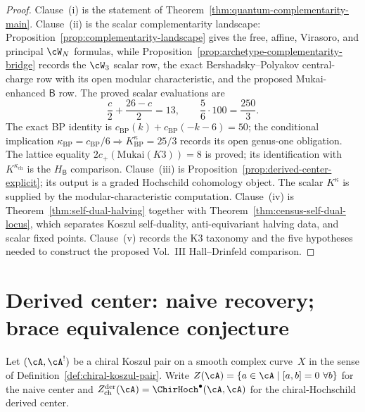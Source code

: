 \begin{proof}
Clause~\textup{(i)} is the statement of
Theorem~\ref{thm:quantum-complementarity-main}. Clause~\textup{(ii)}
is the scalar complementarity landscape:
Proposition~\ref{prop:complementarity-landscape} gives the free,
affine, Virasoro, and principal $\cW_N$ formulas, while
Proposition~\ref{prop:archetype-complementarity-bridge} records the
$\cW_3$ scalar row, the exact Bershadsky--Polyakov central-charge row
with its open modular characteristic, and the proposed
Mukai-enhanced $\mathsf B$ row.  The proved scalar evaluations are
\[
\frac{c}{2}+\frac{26-c}{2}=13,\qquad
\frac56\cdot 100=\frac{250}{3}.
\]
The exact BP identity is $c_{\mathrm{BP}}(k)+
c_{\mathrm{BP}}(-k-6)=50$; the conditional implication
$\kappa_{\mathrm{BP}}=c_{\mathrm{BP}}/6\Rightarrow
K^\kappa_{\mathrm{BP}}=25/3$ records its open genus-one obligation.
The lattice equality $2c_+(\mathrm{Mukai}(K3))=8$ is proved; its
identification with $K^{\kappa_{\mathrm{ch}}}$ is the
\ClaimStatusConjectured{} $H_{\mathsf B}$ comparison.
Clause~\textup{(iii)} is
Proposition~\ref{prop:derived-center-explicit}; its output is a
graded Hochschild cohomology object. The scalar $K^\kappa$ is supplied
by the modular-characteristic computation. Clause~\textup{(iv)} is
Theorem~\ref{thm:self-dual-halving} together with
Theorem~\ref{thm:census-self-dual-locus}, which separates
Koszul self-duality, anti-equivariant halving data, and scalar fixed
points. Clause~\textup{(v)} records the K3 taxonomy and the five
hypotheses needed to construct the proposed Vol.~III Hall--Drinfeld
comparison.
\end{proof}

\section{Derived center: naive recovery; brace equivalence conjecture}
\label{sec:derived-center-koszul-equivalence}

Let $(\cA, \cA^!)$ be a chiral Koszul pair on a smooth complex
curve~$X$ in the sense of
Definition~\ref{def:chiral-koszul-pair}. Write
$Z(\cA) = \{a \in \cA \mid [a, b] = 0\ \forall b\}$ for the naive
center and $Z^{\mathrm{der}}_{\mathrm{ch}}(\cA) =
\ChirHoch^\bullet(\cA, \cA)$ for the chiral-Hochschild derived
center.

